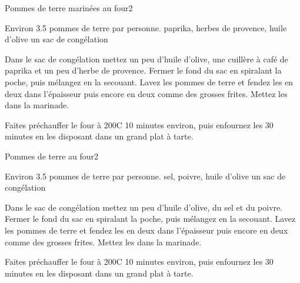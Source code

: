 \begin{recette}{Pommes de terre marinées au four}{2}{}{}
\begin{ingredients}
\ingredient Environ 3.5 pommes de terre par personne.
\ingredient paprika, herbes de provence, huile d'olive
\ingredient un sac de congélation
\end{ingredients}

\begin{preparation}
\etape Dans le sac de congélation mettez un peu d'huile d'olive, une cuillère à café de paprika et un peu d'herbe de provence. Fermer le fond du sac en spiralant la poche, puis mélangez en la secouant.
\etape Lavez les pommes de terre et fendez les en deux dans l'épaisseur puis encore en deux comme des grosses frites.
\etape Mettez les dans la marinade.
\end{preparation}

\begin{cuisson}
Faites préchauffer le four à 200\degres C 10 minutes environ, puis enfournez les 30 minutes en les disposant dans un grand plat à tarte.
\end{cuisson}
\end{recette}

\begin{recette}{Pommes de terre au four}{2}{}{}
\begin{ingredients}
\ingredient Environ 3.5 pommes de terre par personne.
\ingredient sel, poivre, huile d'olive
\ingredient un sac de congélation
\end{ingredients}

\begin{preparation}
\etape Dans le sac de congélation mettez un peu d'huile d'olive, du sel et du poivre. Fermer le fond du sac en spiralant la poche, puis mélangez en la secouant.
\etape Lavez les pommes de terre et fendez les en deux dans l'épaisseur puis encore en deux comme des grosses frites.
\etape Mettez les dans la marinade.
\end{preparation}

\begin{cuisson}
Faites préchauffer le four à 200\degres C 10 minutes environ, puis enfournez les 30 minutes en les disposant dans un grand plat à tarte.
\end{cuisson}

\end{recette}

